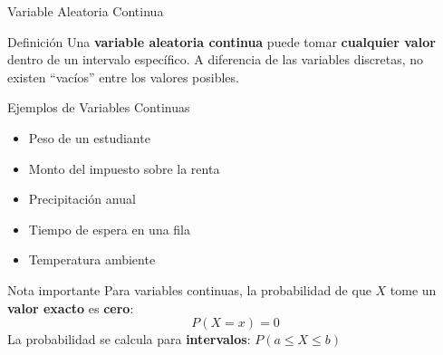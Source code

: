\documentclass[10pt]{beamer}
\begin{document}
\begin{frame}{Variable Aleatoria Continua}
\begin{block}{Definición}
Una \textbf{variable aleatoria continua} puede tomar \textbf{cualquier valor} dentro de un intervalo específico. A diferencia de las variables discretas, no existen ``vacíos'' entre los valores posibles.
\end{block}

\vspace{0.2cm}
\begin{exampleblock}{Ejemplos de Variables Continuas}
\begin{itemize}
  \item Peso de un estudiante
  \item Monto del impuesto sobre la renta
  \item Precipitación anual
  \item Tiempo de espera en una fila
  \item Temperatura ambiente
\end{itemize}
\end{exampleblock}

\vspace{0.2cm}
\begin{alertblock}{Nota importante}
Para variables continuas, la probabilidad de que $X$ tome un \textbf{valor exacto} es \textbf{cero}:
$$P(X = x) = 0$$
La probabilidad se calcula para \textbf{intervalos}: $P(a \leq X \leq b)$
\end{alertblock}
\end{frame}
\end{document}
